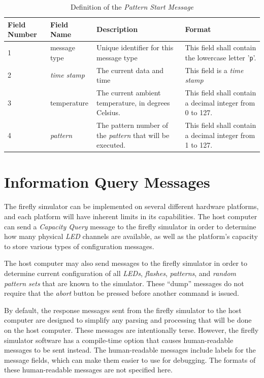\documentclass[letterpaper,11pt]{article}
\begin{document}
\begin{table}[H]
  \caption{Definition of the \textit{Pattern Start Message}}
  \centering
  \setlength\extrarowheight{2pt}
  \begin{tabular}[h]{|p{0.5in}|p{1.00in}|p{2.25in}|p{2.25in}|} \hline
    Field Number & Field Name & Description & Format \\ \hline
    1            & message type

    & Unique identifier for this message type
    & This field shall contain the lowercase letter '\texttt{p}'.
    \\ \hline
    2            & \textit{time stamp}
    & The current data and time
    & This field is a \textit{time stamp}
    \\ \hline
    3            & temperature
    & The current ambient temperature, in degrees Celsius.
    & This field shall contain a decimal integer from 0 to 127.
    \\ \hline
    4            & \textit{pattern}

    & The pattern number of the \textit{pattern} that will be executed.
    & This field shall contain a decimal integer from 1 to 127.
    \\ \hline
  \end{tabular}
  \label{tab:PatternStart}
\end{table}

\section{Information Query Messages}

The firefly simulator can be implemented on several different hardware
platforms, and each platform will have inherent limits in its capabilities.
The host computer can send a \textit{Capacity Query} message to the firefly
simulator in order to determine how many physical \textit{LED} channels are
available, as well as the platform's capacity to store various types of
configuration messages.

The host computer may also send messages to the firefly simulator in order to
determine current configuration of all \textit{LEDs}, \textit{flashes},
\textit{patterns}, and \textit{random pattern sets} that are known to the
simulator. These ``dump'' messages do not require that the \textit{abort}
button be pressed before another command is issued.

By default, the response messages sent from the firefly simulator to the host
computer are designed to simplify any parsing and processing that will be done
on the host computer. These messages are intentionally terse. However, the
firefly simulator software has a compile-time option that causes human-readable
messages to be sent instead. The human-readable messages include labels for
the message fields, which can make them easier to use for debugging. The
formats of these human-readable messages are not specified here.
\end{document}
